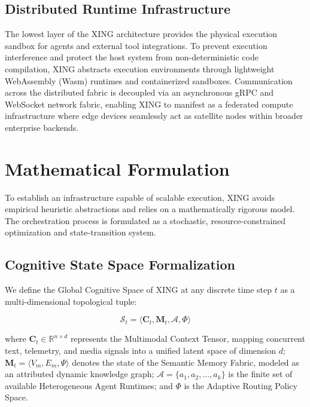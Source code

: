 \documentclass[conference]{IEEEtran}
\newcommand{\R}{\mathbb{R}}
\begin{document}
\subsection{Distributed Runtime Infrastructure}

The lowest layer of the XING architecture provides the physical execution sandbox for agents and external tool integrations. To prevent execution interference and protect the host system from non-deterministic code compilation, XING abstracts execution environments through lightweight WebAssembly (Wasm) runtimes and containerized sandboxes. Communication across the distributed fabric is decoupled via an asynchronous gRPC and WebSocket network fabric, enabling XING to manifest as a federated compute infrastructure where edge devices seamlessly act as satellite nodes within broader enterprise backends.

\section{Mathematical Formulation}

To establish an infrastructure capable of scalable execution, XING avoids empirical heuristic abstractions and relies on a mathematically rigorous model. The orchestration process is formulated as a stochastic, resource-constrained optimization and state-transition system.

\subsection{Cognitive State Space Formalization}

We define the Global Cognitive Space of XING at any discrete time step $t$ as a multi-dimensional topological tuple:

\begin{equation}
    \mathcal{S}_t = \langle \mathbf{C}_t, \mathbf{M}_t, \mathcal{A}, \Phi \rangle
    \label{eq:state_space}
\end{equation}

where $\mathbf{C}_t \in \R^{n \times d}$ represents the Multimodal Context Tensor, mapping concurrent text, telemetry, and media signals into a unified latent space of dimension $d$; $\mathbf{M}_t = \langle V_m, E_m, \Psi \rangle$ denotes the state of the Semantic Memory Fabric, modeled as an attributed dynamic knowledge graph; $\mathcal{A} = \{a_1, a_2, \ldots, a_k\}$ is the finite set of available Heterogeneous Agent Runtimes; and $\Phi$ is the Adaptive Routing Policy Space.
\end{document}
